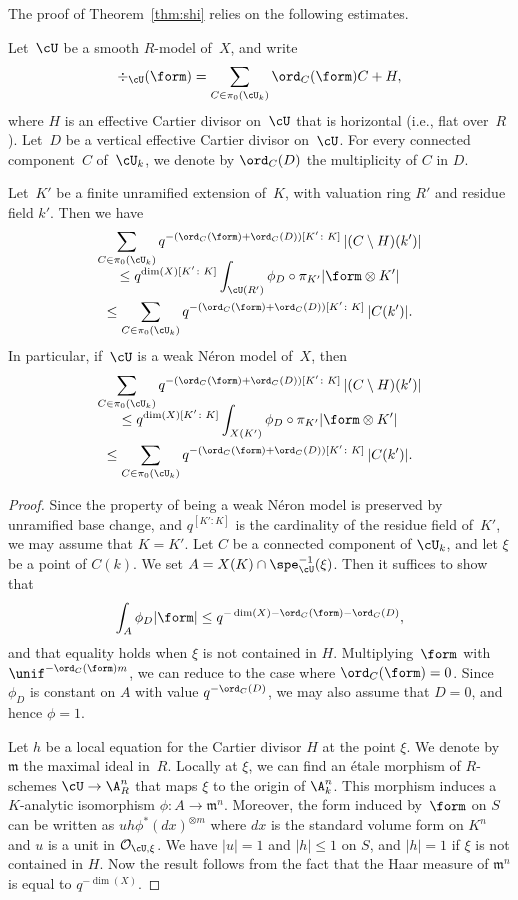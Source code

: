 The proof of Theorem~\ref{thm:shi} relies on the following estimates.
\begin{prop}\label{prop:int}
Let~$\cU$ be a smooth $R$\nobreakdash-model of~$X$, and write
\[
\div_{\cU}(\form)=\sum_{C\in \pi_0(\cU_k)}\ord_C(\form)C+H,
\]
where $H$ is an effective Cartier divisor on~$\cU$ that is horizontal (i.e., flat over~$R$).
Let~$D$ be a vertical effective Cartier divisor on~$\cU$. For every connected component~$C$ of~$\cU_k$, we denote by $\ord_C(D)$ the multiplicity of $C$ in $D$.

Let~$K'$ be a finite unramified extension of~$K$, with valuation ring $R'$ and residue field $k'$.
Then we have
\begin{multline*}
\sum_{C\in \pi_0(\cU_k)}q^{-(\ord_C(\form)+\ord_C(D))[K'\colon K]}\,|(C\setminus H)(k')|\\[-8pt]
\leq q^{\dim(X)[K'\colon K]} \int_{\cU(R')}\phi_D\circ\pi_{K'} |\form\otimes K'| \\
\leq \sum_{C\in \pi_0(\cU_k)}q^{-(\ord_C(\form)+\ord_C(D))[K'\colon K]}\,|C(k')|.
\end{multline*}
In particular, if~$\cU$ is a weak Néron model of~$X$, then
\begin{multline*}
\sum_{C\in \pi_0(\cU_k)}q^{-(\ord_C(\form)+\ord_C(D))[K'\colon K]}\,|(C\setminus H)(k')|\\[-8pt]
\leq q^{\dim(X)[K'\colon K]} \int_{X(K')}\phi_D\circ\pi_{K'} |\form\otimes K'| \\
\leq \sum_{C\in \pi_0(\cU_k)}q^{-(\ord_C(\form)+\ord_C(D))[K'\colon K]}\,|C(k')|.
\end{multline*}
\end{prop}
\begin{proof}
Since the property of being a weak Néron model is preserved by unramified base change, and $q^{[K'\colon K]}$ is the cardinality of the residue field of~$K'$, we may assume that $K=K'$.
Let $C$ be a connected component of $\cU_k$, and let $\xi$ be a point of $C(k)$.
We set $A=X(K)\cap \spe_{\cU}^{-1}(\xi)$.
Then it suffices to show that
\[
\int_{A}\phi_D|\form| \leq q^{-\dim(X)-\ord_C(\form)-\ord_C(D)},
\]
and that equality holds when $\xi$ is not contained in $H$. Multiplying~$\form$ with $\unif^{-\ord_C(\form)m}$, we can reduce to the case where
$\ord_C(\form)=0$. Since $\phi_D$ is constant on $A$ with value $q^{-\ord_C(D)}$, we may also assume that $D=0$, and hence $\phi=1$.

Let $h$ be a local equation for the Cartier divisor $H$ at the point $\xi$.
We denote by~$\mathfrak{m}$ the maximal ideal in~$R$.
Locally at $\xi$, we can find an étale morphism of $R$\nobreakdash-schemes $\cU\to \A^n_R$ that maps $\xi$ to the origin of $\A^n_k$.
This morphism induces a $K$\nobreakdash-analytic isomorphism $\phi:A\to \mathfrak{m}^n$. Moreover,
the form induced by~$\form$ on $S$ can be written as $uh\phi^*(dx)^{\otimes m}$ where $dx$ is the standard volume form on $K^n$ and $u$ is a unit in $\mathcal{O}_{\cU,\xi}$.
We have $|u|=1$ and $|h|\leq 1$ on $S$, and $|h|=1$ if $\xi$ is not contained in $H$. Now the result follows from the fact that the Haar measure of $\mathfrak{m}^n$ is equal to $q^{-\dim(X)}$.
\end{proof}

